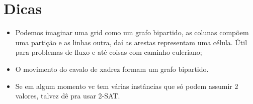     \section{Dicas}
    \begin{itemize}
        \item Podemos imaginar uma grid como um grafo bipartido, as colunas compõem uma partição e as linhas outra, daí as arestas representam uma célula. Útil para problemas de fluxo e até coisas com caminho euleriano;
        \item O movimento do cavalo de xadrez formam um grafo bipartido.
        \item Se em algum momento vc tem várias instâncias que só podem assumir 2 valores, talvez dê pra usar 2-SAT.
    \end{itemize}
